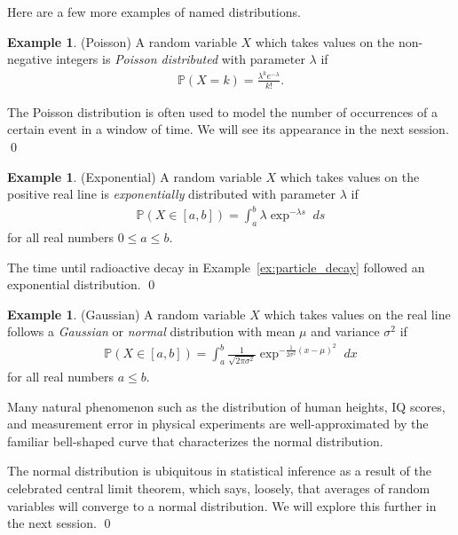 \documentclass[11pt]{article}
\theoremstyle{definition}
\newtheorem{example}[theorem]{Example}
\renewcommand{\P}{\mathbb{P}}
\begin{document}
Here are a few more examples of named distributions.

\begin{example}(Poisson)
A random variable $X$ which takes values on the non-negative integers is
\textit{Poisson distributed} with parameter $\lambda$ if
\begin{align}
  \P(X = k) = \frac{\lambda^k e^{-\lambda}}{k!}.
  \label{eq:poisson}
\end{align}

The Poisson distribution is often used to model the number of occurrences
of a certain event in a window of time. We will see its appearance in the next session.
\qed
\end{example}

\begin{example}(Exponential)
A random variable $X$ which takes values on the positive real line is
\textit{exponentially} distributed with parameter $\lambda$ if
\begin{align}
  \P(X \in [a, b]) =
  \int_a^b \lambda \exp^{-\lambda s} \;ds
  \label{eq:exponential}
\end{align}
for all real numbers $0 \leq a \leq b$.

The time until radioactive decay in Example~\ref{ex:particle_decay}
followed an exponential distribution.
\qed
\end{example}

\begin{example}(Gaussian)
A random variable $X$ which takes values on the real line follows a
\textit{Gaussian} or \textit{normal} distribution with mean $\mu$ and variance
$\sigma^2$ if
\begin{align}
  \P(X \in [a, b]) =
  \int_a^b \frac{1}{\sqrt{2\pi\sigma^2}}
  \exp^{-\frac{1}{2\sigma^2}(x - \mu)^2} \; dx
  \label{eq:normal}
\end{align}
for all real numbers $a \leq b$.

Many natural phenomenon such as the distribution of human heights, IQ scores, and
measurement error in physical experiments are well-approximated by the familiar
bell-shaped curve that characterizes the normal distribution.

The normal distribution is ubiquitous in statistical inference as a result of
the celebrated central limit theorem, which says, loosely, that averages
of random variables will converge to a normal distribution. We will explore this further in the next session.
\qed
\end{example}
\end{document}
